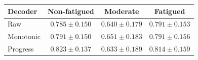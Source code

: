 \begin{tabular}{lccc}
\toprule
Decoder & Non-fatigued & Moderate & Fatigued \\
\midrule
Raw & $0.785 \pm 0.150$ & $0.640 \pm 0.179$ & $0.791 \pm 0.153$ \\
Monotonic & $0.791 \pm 0.150$ & $0.651 \pm 0.183$ & $0.791 \pm 0.156$ \\
Progress & $0.823 \pm 0.137$ & $0.633 \pm 0.189$ & $0.814 \pm 0.159$ \\
\bottomrule
\end{tabular}